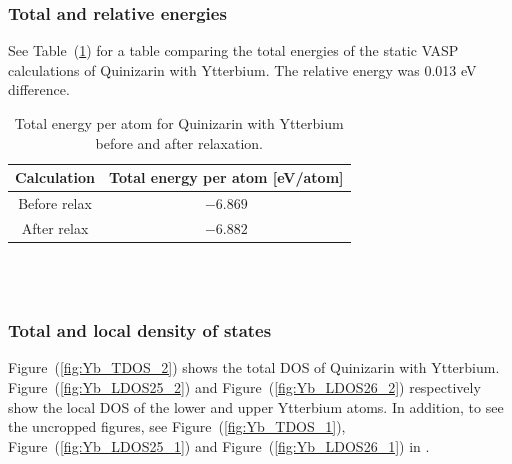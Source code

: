 \documentclass{article}
\begin{document}
      \vspace{1cm}

    \subsubsection{Total and relative energies}

      See Table~(\ref{tab:TOTENYb}) for a table comparing the total energies of the static VASP calculations of Quinizarin with Ytterbium. The relative energy was 0.013 eV difference. \\

      \begin{table}[H]
        \centering
        \caption{Total energy per atom for Quinizarin with Ytterbium before and after relaxation. }
        \label{tab:TOTENYb}
        \begin{tabular}{|c|c|}
            \hline
            Calculation & Total energy per atom [eV/atom]  \\
            \hline \hline
            Before relax & $-6.869$ \\
            After relax & $-6.882$ \\
            \hline
        \end{tabular} \\
        \hspace{0pt}\\
      \end{table}

      \vspace{1cm}

    \subsubsection{Total and local density of states}

      Figure~(\ref{fig:Yb_TDOS_2}) shows the total DOS of Quinizarin with Ytterbium. Figure~(\ref{fig:Yb_LDOS25_2}) and Figure~(\ref{fig:Yb_LDOS26_2}) respectively show the local DOS of the lower and upper Ytterbium atoms.
      In addition, to see the uncropped figures, see Figure~(\ref{fig:Yb_TDOS_1}), Figure~(\ref{fig:Yb_LDOS25_1}) and Figure~(\ref{fig:Yb_LDOS26_1}) in . \\
\end{document}
